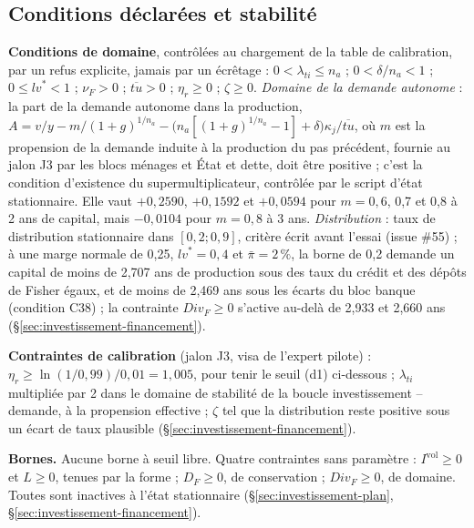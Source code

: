 \documentclass[11pt,a4paper]{article}
\begin{document}
\subsection{Conditions déclarées et stabilité}
\label{sec:investissement-conditions}
\begin{proposee}
\textbf{Conditions de domaine}, contrôlées au chargement de la table de calibration, par un refus explicite, jamais par un écrêtage : $0 < \lambda_{\mathit{ti}} \le n_a$ ; $0 < \delta/n_a < 1$ ; $0 \le \mathit{lv}^\ast < 1$ ; $\nu_F > 0$ ; $\overline{\mathit{tu}} > 0$ ; $\eta_r \ge 0$ ; $\zeta \ge 0$. \emph{Domaine de la demande autonome} : la part de la demande autonome dans la production, $A = v/y - m/(1 + g)^{1/n_a} - \bigl(n_a[(1 + g)^{1/n_a} - 1] + \delta\bigr)\kappa_j/\overline{\mathit{tu}}$, où $m$ est la propension de la demande induite à la production du pas précédent, fournie au jalon J3 par les blocs ménages et État et dette, doit être positive ; c'est la condition d'existence du supermultiplicateur, contrôlée par le script d'état stationnaire. Elle vaut $+0{,}2590$, $+0{,}1592$ et $+0{,}0594$ pour $m = 0{,}6$, 0,7 et 0,8 à 2 ans de capital, mais $-0{,}0104$ pour $m = 0{,}8$ à 3 ans. \emph{Distribution} : taux de distribution stationnaire dans $[0{,}2 ; 0{,}9]$, critère écrit avant l'essai (issue \#55) ; à une marge normale de 0,25, $\mathit{lv}^\ast = 0{,}4$ et $\bar\pi = 2\,\%$, la borne de 0,2 demande un capital de moins de 2,707 ans de production sous des taux du crédit et des dépôts de Fisher égaux, et de moins de 2,469 ans sous les écarts du bloc banque (condition C38) ; la contrainte $\mathit{Div}_F \ge 0$ s'active au-delà de 2,933 et 2,660 ans (\S\ref{sec:investissement-financement}).

\textbf{Contraintes de calibration} (jalon J3, visa de l'expert pilote) : $\eta_r \ge \ln(1/0{,}99)/0{,}01 = 1{,}005$, pour tenir le seuil (d1) ci-dessous ; $\lambda_{\mathit{ti}}$ multipliée par 2 dans le domaine de stabilité de la boucle investissement -- demande, à la propension effective ; $\zeta$ tel que la distribution reste positive sous un écart de taux plausible (\S\ref{sec:investissement-financement}).

\textbf{Bornes.} Aucune borne à seuil libre. Quatre contraintes sans paramètre : $I^{\mathrm{vol}} \ge 0$ et $L \ge 0$, tenues par la forme ; $D_F \ge 0$, de conservation ; $\mathit{Div}_F \ge 0$, de domaine. Toutes sont inactives à l'état stationnaire (\S\ref{sec:investissement-plan}, \S\ref{sec:investissement-financement}).


\end{proposee}
\end{document}
